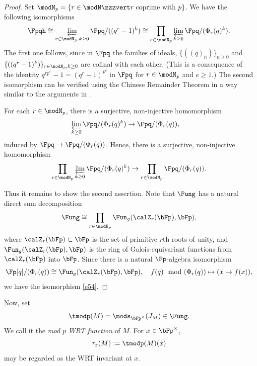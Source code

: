 \documentclass{amsart}
\numberwithin{equation}{section}
\numberwithin{figure}{section}
\theoremstyle{plain}
\theoremstyle{definition}
\theoremstyle{remark}
\begin{document}
\begin{proof}
  Set $\modN _p=\{r\in \modN \zzzvert \text{$r$ coprime with $p$}\}$.  We have the
  following isomorphisms
  \begin{equation*}
    \Fpqh
    \cong\varprojlim_{r\in \modN _p,k\ge 0}\Fpq/((q^r-1)^k)
    \cong\prod_{r\in \modN _p}\varprojlim_{k\ge 0}\Fpq/(\Phi _r(q)^k).
  \end{equation*}
  The first one follows, since in $\Fpq$ the families of ideals,
  $\{((q)_n)\}_{n\ge 0}$ and $\{((q^r-1)^k)\}_{r\in \modN _p,k\ge 0}$ are cofinal
  with each other.  (This is a consequence of the identity
  $q^{rp^e}-1=(q^r-1)^{p^e}$ in $\Fpq$ for $r\in \modN _p$ and $e\ge 1$.)  The
  second isomorphism can be verified using the Chinese Remainder
  Theorem in a way similar to the arguments in \cite[Section
  7.5]{H:cyclotomic}.

  For each $r\in \modN _p$, there is a surjective, non-injective
  homomorphism
  \begin{equation*}
    \varprojlim_{k\ge 0}\Fpq/(\Phi _r(q)^k)\rightarrow \Fpq/(\Phi _r(q)),\quad
  \end{equation*}
  induced by $\Fpq\rightarrow \Fpq/(\Phi _r(q))$.  Hence, there is a surjective,
  non-injective homomorphism
  \begin{equation*}
    \prod_{r\in \modN _p}\varprojlim_{k\ge 0}\Fpq/(\Phi _r(q)^k)\rightarrow \prod_{r\in \modN _p}\Fpq/(\Phi _r(q)).
  \end{equation*}

  Thus it remains to show the second assertion.  Note that $\Fung$ has
  a natural direct sum decomposition
  \begin{equation*}
    \Fung \cong \prod_{r\in \modN _p}\Fun_g(\calZ_r(\bFp),\bFp),
  \end{equation*}
  where $\calZ_r(\bFp)\subset \bFp$ is the set of primitive $r$th roots of
  unity, and $\Fun_g(\calZ_r(\bFp),\bFp)$ is the ring of
  Galois-equivariant functions from $\calZ_r(\bFp)$ into $\bFp$.  Since
  there is a natural $\Fp$-algebra isomorphism
  \begin{equation*}
    \Fp[q]/(\Phi _r(q))\cong \Fun_g(\calZ_r(\bFp),\bFp), \quad
    f(q)\mod{(\Phi _r(q))}\mapsto (x\mapsto f(x)),
  \end{equation*}
  we have  the isomorphism \eqref{e54}.
\end{proof}

Now, set
\begin{equation}
  \label{e22}
  \tmodp(M)=\mods _{\bFp^\times }(J_M)\in \Fung.
\end{equation}
We call it the {\em mod $p$ WRT function} of
$M$.  For $x\in \bFp^\times $,
\begin{equation*}
  \tau _x(M):=\tmodp(M)(x)
\end{equation*}
may be regarded as the WRT invariant at $x$.
\end{document}
